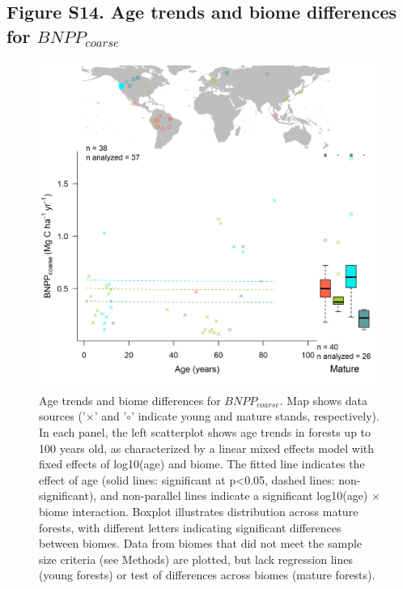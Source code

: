 \documentclass[
]{article}
\begin{document}
\newpage

\hypertarget{figure-s14.-age-trends-and-biome-differences-for-bnpp_coarse}{%
\subsection{\texorpdfstring{Figure S14. Age trends and biome differences
for
\(BNPP_{coarse}\)}{Figure S14. Age trends and biome differences for BNPP\_\{coarse\}}}\label{figure-s14.-age-trends-and-biome-differences-for-bnpp_coarse}}

\begin{figure}[H]

{\centering \includegraphics[width=1\linewidth]{tables_figures/age_trends/BNPP_coarse_with_map} 

}

\caption{Age trends and biome differences for $BNPP_{coarse}$. Map shows data sources ('$\times$' and '$\circ$' indicate young and mature stands, respectively). In each panel, the left scatterplot shows age trends in forests up to 100 years old, as characterized by a linear mixed effects model with fixed effects of log10(age) and biome. The fitted line indicates the effect of age (solid lines: significant at p<0.05, dashed lines: non-significant), and non-parallel lines indicate a significant log10(age) $\times$ biome interaction. Boxplot illustrates distribution across mature forests, with different letters indicating significant differences between biomes. Data from biomes that did not meet the sample size criteria (see Methods) are plotted, but lack regression lines (young forests) or test of differences across biomes (mature forests).}\label{fig:unnamed-chunk-17}
\end{figure}
\end{document}
